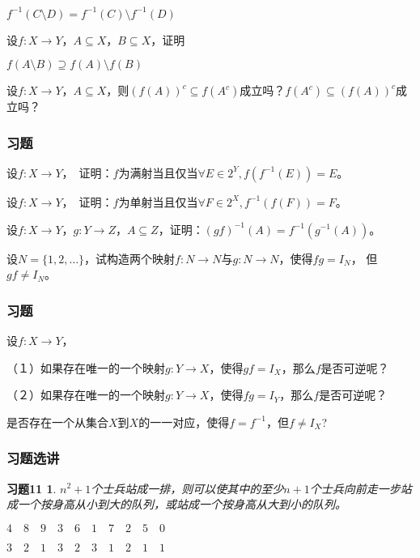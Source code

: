 \documentclass{beamer}
\begin{document}
\begin{CJK*}{UTF8}{gbsn}
\begin{frame}
\begin{Exercise}
    $f^{-1}(C \setminus D) = f^{-1}(C) \setminus f^{-1}(D)$
  \end{Exercise}
    \begin{Exercise}
    设$f:X \to Y$，$A \subseteq X$，$B \subseteq X$，证明

    $f(A \setminus B) \supseteq f(A) \setminus f(B)$
    
  \end{Exercise}
  \begin{Exercise}
    设$f:X\to Y$，$A \subseteq X$，则$(f(A))^c \subseteq f(A^c)$成立吗？$ f(A^c)\subseteq (f(A))^c$成立吗？
  \end{Exercise}

\end{frame}

\begin{frame}
  \frametitle{习题}
  \begin{Exercise}
    设$f:X\to Y$，　证明：$f$为满射当且仅当$\forall E \in 2^Y, f(f^{-1}(E)) = E$。
  \end{Exercise}

  \begin{Exercise}
    设$f:X\to Y$，　证明：$f$为单射当且仅当$\forall F \in 2^X, f^{-1}(f(F)) = F$。    
  \end{Exercise}
    \begin{Exercise}
    设$f:X \to Y$，$g:Y \to Z$，$A \subseteq Z$，证明：$(gf)^{-1}(A) = f^{-1}(g^{-1}(A))$。
  \end{Exercise}
  \begin{Exercise}
    设$N=\{1,2,\ldots\}$，试构造两个映射$f:N \to N$与$g:N\to N$，使得$fg = I_N$，
    但$gf \neq I_N$。
  \end{Exercise}
\end{frame}
\begin{frame}
  \frametitle{习题}
 \begin{Exercise}
    设$f:X \to Y$，

    （１）如果存在唯一的一个映射$g:Y\to X$，使得$gf = I_X$，那么$f$是否可逆呢？

    （２）如果存在唯一的一个映射$g:Y\to X$，使得$fg = I_Y$，那么$f$是否可逆呢？

  \end{Exercise}
  \begin{Exercise}
    是否存在一个从集合$X$到$X$的一一对应，使得$f=f^{-1}$，但$f \neq I_X$?
  \end{Exercise}
\end{frame}
\newtheorem*{Exercise11}{习题11}

\begin{frame}
  \frametitle{习题选讲}
  \begin{Exercise11}
    $n^2+1$个士兵站成一排，则可以使其中的至少$n+1$个士兵向前走一步站成一个按身高从小到大的队列，或站成一个按身高从大到小的队列。
  \end{Exercise11}
  $4\quad8\quad9\quad3\quad6\quad1\quad7\quad2\quad5\quad0$

  $3\quad2\quad1\quad3\quad2\quad3\quad1\quad2\quad1\quad1$
  
\end{frame}
\end{CJK*}
\end{document}
